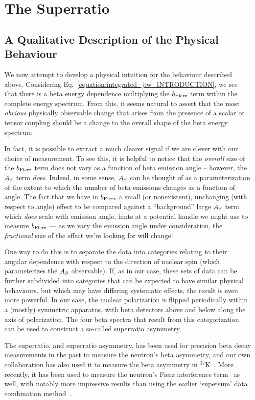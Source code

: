 \section{The Superratio}
\subsection{A Qualitative Description of the Physical Behaviour}
\label{signature_chapter}
We now attempt to develop a physical intuition for the behaviour described above.  Considering Eq.~\ref{equation:integrated_jtw_INTRODUCTION}, we see that there is a beta energy dependence multiplying the $b_{\mathrm{Fierz}}$ term within the complete energy spectrum.  From this, it seems natural to assert that the most \emph{obvious} physically observable change that arises from the presence of a scalar or tensor coupling should be a change to the overall shape of the beta energy spectrum.  

In fact, it is possible to extract a much clearer signal if we are clever with our choice of measurement.  To see this, it is helpful to notice that the \emph{overall} size of the $b_{\mathrm{Fierz}}$ term does not vary as a function of beta emission angle -- however, the $A_{\beta}$ term \emph{does}.  Indeed, in some sense, $A_{\beta}$ can be thought of as a parameterization of the extent to which the number of beta emissions changes as a function of angle.  The fact that we have in $b_{\mathrm{Fierz}}$ a small (or nonexistent), unchanging (with respect to angle) effect to be compared against a ``background'' large $A_{\beta}$ term which \emph{does} scale with emission angle, hints at a potential handle we might use to measure $b_{\mathrm{Fierz}}$ --- as we vary the emission angle under consideration, the \emph{fractional} size of the effect we're looking for will change!

One way to do this is to separate the data into categories relating to their angular dependence with respect to the direction of nuclear spin (which parameterizes the $A_{\beta}$ observable).  If, as in our case, these sets of data can be further subdivided into categories that can be expected to have similar physical behaviours, but which may have differing systematic effects, the result is even more powerful.  In our case, the nuclear polarization is flipped periodically within a (mostly) symmetric apparatus, with beta detectors above and below along the axis of polarization.  The four beta spectra that result from this categorization can be used to construct a so-called superratio asymmetry.   

The superratio, and superratio asymmetry, has been used for precision beta decay measurements in the past to measure the neutron's beta asymmetry\cite{UCNA_first_superratio}, and our own collaboration has also used it to measure the beta asymmetry in $^{37}$K~\cite{ben_Abeta}.  More recently, it has been used to measure the neutron's Fierz interference term~\cite{UCNAfierz2020}\cite{Saul2020} as well, with notably more impressive results than using the earlier `supersum' data combination method~\cite{UCNA_first_Fierz}.  

